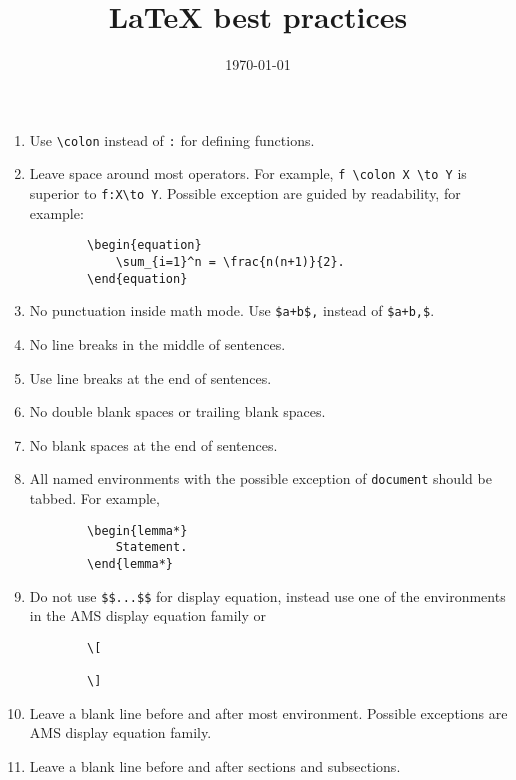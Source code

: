 \documentclass{amsart}
\title{{\LaTeX} best practices}
\date{\today}
\begin{document}
	\maketitle

	\begin{enumerate}[1)]
		\item Use \verb|\colon| instead of \verb|:| for defining functions.

		\item Leave space around most operators.
		For example, \verb|f \colon X \to Y| is superior to \verb|f:X\to Y|.
		Possible exception are guided by readability, for example:
		\begin{verbatim}
		\begin{equation}
		    \sum_{i=1}^n = \frac{n(n+1)}{2}.
		\end{equation}
		\end{verbatim}

		\item No punctuation inside math mode.
		Use \verb|$a+b$,| instead of \verb|$a+b,$|.

		\item No line breaks in the middle of sentences.

		\item Use line breaks at the end of sentences.

		\item No double blank spaces or trailing blank spaces.

		\item No blank spaces at the end of sentences.

		\item All named environments with the possible exception of \verb|document| should be tabbed.
		For example,
		\begin{verbatim}
		\begin{lemma*}
		    Statement.
		\end{lemma*}
		\end{verbatim}

		\item Do not use \verb|$$...$$| for display equation, instead use one of the environments in the AMS display equation family or
		\begin{verbatim}
		\[

		\]
		\end{verbatim}

		\item Leave a blank line before and after most environment.
		Possible exceptions are AMS display equation family.

		\item Leave a blank line before and after sections and subsections.
	\end{enumerate}
\end{document}
